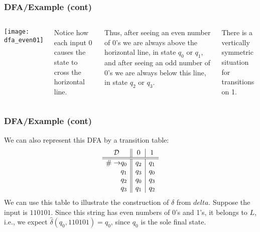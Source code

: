 % 
\begin{frame}
\frametitle{DFA/Example (cont)}

\begin{columns}
  \begin{center}
    \texttt{[image: dfa\_even01]}
  \end{center}

   Notice how each input 0 causes the state to
  cross the horizontal line.
 
  \bigskip

  Thus, after seeing an even number of 0's we are always above the
  horizontal line, in state \(q_0\) or \(q_1\), and after seeing an
  odd number of 0's we are always below this line, in state \(q_2\) or
  \(q_3\).

  \bigskip

  There is a vertically symmetric situation for transitions on 1.
\end{columns}

\end{frame}

% 
\begin{frame}
\frametitle{DFA/Example (cont)}

We can also represent this DFA by a transition table:
\[
\begin{array}{r@{}l||c|c}
\multicolumn{2}{c||}{\cal D} & 0 & 1\\
\hline\hline
\# \rightarrow & q_0 & q_2 & q_1\\
               & q_1 & q_3 & q_0\\
               & q_2 & q_0 & q_3\\
               & q_3 & q_1 & q_2
\end{array}
\]
We can use this table to illustrate the construction of
\(\hat{\delta}\) from \(delta\). Suppose the input is
\(110101\). Since this string has even numbers of 0's and 1's, it
belongs to \(L\), i.e., we expect \(\hat{\delta}(q_0,110101) = q_0\),
since \(q_0\) is the sole final state.

\end{frame}


